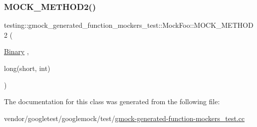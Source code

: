 \subsubsection{\texorpdfstring{M\+O\+C\+K\+\_\+\+M\+E\+T\+H\+O\+D2()}{MOCK\_METHOD2()}}
{\footnotesize\ttfamily testing\+::gmock\+\_\+generated\+\_\+function\+\_\+mockers\+\_\+test\+::\+Mock\+Foo\+::\+M\+O\+C\+K\+\_\+\+M\+E\+T\+H\+O\+D2 (\begin{DoxyParamCaption}\item[{\hyperlink{classtesting_1_1gmock__generated__function__mockers__test_1_1_foo_interface_a59ea28b711ece054ce9d57c2dc574ba0}{Binary}}]{,  }\item[{long(short, int)}]{ }\end{DoxyParamCaption})}



The documentation for this class was generated from the following file\+:\begin{DoxyCompactItemize}
\item 
vendor/googletest/googlemock/test/\hyperlink{gmock-generated-function-mockers__test_8cc}{gmock-\/generated-\/function-\/mockers\+\_\+test.\+cc}\end{DoxyCompactItemize}
